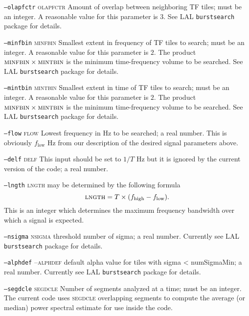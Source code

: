 \begin{entry}
\begin{entry}
\item[\texttt{--olapfctr} \textsc{olapfctr}] Amount of overlap between
neighboring TF tiles; must be an integer.  A reasonable value for this
parameter is $3$.  See LAL \texttt{burstsearch} package for details.  

\item[\texttt{--minfbin} \textsc{minfbin}] Smallest extent in frequency of
TF tiles to search;  must be an integer.  A reasonable value for this
parameter is $2$.   The product $\mbox{\textsc{minfbin}} \times
\mbox{\textsc{mintbin}}$ is the minimum time-frequency volume to
be searched.  See LAL \texttt{burstsearch} package for details.

\item[\texttt{--mintbin} \textsc{mintbin}] Smallest extent in time of TF
tiles to search;  must be an integer. A reasonable value for this
parameter is $2$.   The product $\mbox{\textsc{minfbin}} \times
\mbox{\textsc{mintbin}}$ is the minimum time-frequency volume to
be searched.  See LAL \texttt{burstsearch} package for details.

\item[\texttt{--flow} \textsc{flow}] Lowest frequency in Hz to be searched;
a real number.  This is obviously $f_{\mathrm{low}}$ Hz from our
description of the desired signal parameters above.

\item[\texttt{--delf} \textsc{delf}] This input should be set to $1/T$ Hz but
it is ignored by the current version of the code;
a real number.

\item[\texttt{--lngth} \textsc{lngth}] may be determined by the following
formula
\[
\mbox{\textsc{lngth}} = T \times ({f_{\mathrm{high}} - f_{\mathrm{low}}}) .
\]
This is an integer which determines the maximum frequency bandwidth
over which a signal is expected.  

\item[\texttt{--nsigma} \textsc{nsigma}] threshold number of sigma;
a real number.
Currently see LAL \texttt{burstsearch} package for details.

\item[\texttt{--alphdef} --\textsc{alphdef}] default alpha value for tiles
with sigma < numSigmaMin;
a real number. Currently see LAL \texttt{burstsearch}
package for details.

\item[\texttt{--segdcle} \textsc{segdcle}] Number of segments analyzed
at a time;  must be an integer.  The current code uses
\textsc{segdcle} overlapping segments to compute the average (or
median) power spectral estimate for use inside the code.


\end{entry}
\end{entry}
